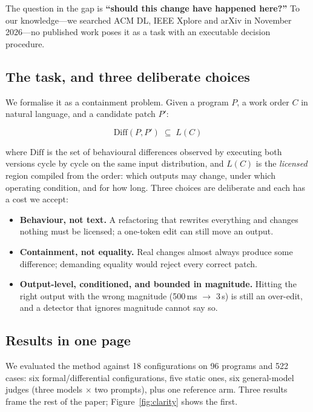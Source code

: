 \documentclass[acmsmall,screen,review,anonymous]{acmart}
\begin{document}
The question in the gap is \textbf{``should this change have happened here?''} To our knowledge---we searched ACM DL, IEEE Xplore and arXiv in November 2026---no published work poses it as a task with an executable decision procedure.

\subsection{The task, and three deliberate choices}

We formalise it as a containment problem. Given a program $P$, a work order $C$ in natural language, and a candidate patch $P'$:

\begin{equation}
\mathrm{Diff}(P,P') \;\subseteq\; L(C)
\label{eq:containment}
\end{equation}

where $\mathrm{Diff}$ is the set of behavioural differences observed by executing both versions cycle by cycle on the same input distribution, and $L(C)$ is the \emph{licensed} region compiled from the order: which outputs may change, under which operating condition, and for how long. Three choices are deliberate and each has a cost we accept:

\begin{itemize}
\item \textbf{Behaviour, not text.} A refactoring that rewrites everything and changes nothing must be licensed; a one-token edit can still move an output.
\item \textbf{Containment, not equality.} Real changes almost always produce some difference; demanding equality would reject every correct patch.
\item \textbf{Output-level, conditioned, and bounded in magnitude.} Hitting the right output with the wrong magnitude (500\,ms $\to$ 3\,s) is still an over-edit, and a detector that ignores magnitude cannot say so.
\end{itemize}

\subsection{Results in one page}

We evaluated the method against 18 configurations on 96 programs and 522
cases: six formal\slash differential configurations, five static ones, six
general-model judges (three models $\times$ two prompts), plus one reference
arm. Three results frame the rest of the paper; Figure~\ref{fig:clarity} shows the first.
\end{document}

